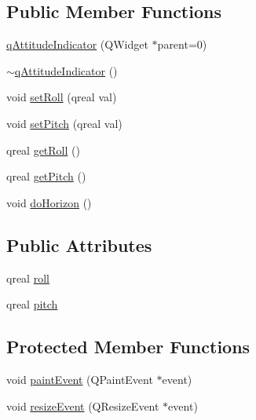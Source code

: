 \subsection*{Public Member Functions}
\begin{DoxyCompactItemize}
\item 
\hyperlink{classqAttitudeIndicator_abe94ed4d04dc448478a7ba19b42790b4}{q\-Attitude\-Indicator} (Q\-Widget $\ast$parent=0)
\item 
\hyperlink{classqAttitudeIndicator_a94754ebda94552125ff33481abe5a0ac}{$\sim$q\-Attitude\-Indicator} ()
\item 
void \hyperlink{classqAttitudeIndicator_a68de255908b787293310a088ef47c49b}{set\-Roll} (qreal val)
\item 
void \hyperlink{classqAttitudeIndicator_a5d8bcc03d0ba08c1494b0a32f56de91c}{set\-Pitch} (qreal val)
\item 
qreal \hyperlink{classqAttitudeIndicator_a6073499d7c349663f04dfef0b3788087}{get\-Roll} ()
\item 
qreal \hyperlink{classqAttitudeIndicator_a73dd028c85bba14faaca24b321b077f8}{get\-Pitch} ()
\item 
void \hyperlink{classqAttitudeIndicator_a7d4e7b19bc493de63a91b0e0480c24e2}{do\-Horizon} ()
\end{DoxyCompactItemize}
\subsection*{Public Attributes}
\begin{DoxyCompactItemize}
\item 
qreal \hyperlink{classqAttitudeIndicator_a10c98e2fd9195050cb305f4b12bf75bb}{roll}
\item 
qreal \hyperlink{classqAttitudeIndicator_ae0df6492b15cc2d3f51c3de0e6dd08bd}{pitch}
\end{DoxyCompactItemize}
\subsection*{Protected Member Functions}
\begin{DoxyCompactItemize}
\item 
void \hyperlink{classqAttitudeIndicator_ab78d82e32c6f34dd246ef0deeda82400}{paint\-Event} (Q\-Paint\-Event $\ast$event)
\item 
void \hyperlink{classqAttitudeIndicator_aa37745feddf31f9ce553156ce51732bd}{resize\-Event} (Q\-Resize\-Event $\ast$event)
\end{DoxyCompactItemize}
